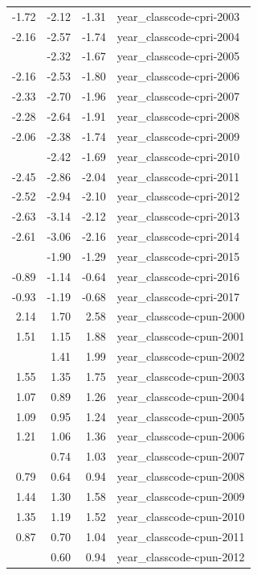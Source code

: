 \documentclass[]{article}
\begin{document}
\begin{longtable}[t]{rrrl}
-1.72 & -2.12 & -1.31 & year\_classcode-cpri-2003\\
-2.16 & -2.57 & -1.74 & year\_classcode-cpri-2004\\
\addlinespace
-2.00 & -2.32 & -1.67 & year\_classcode-cpri-2005\\
-2.16 & -2.53 & -1.80 & year\_classcode-cpri-2006\\
-2.33 & -2.70 & -1.96 & year\_classcode-cpri-2007\\
-2.28 & -2.64 & -1.91 & year\_classcode-cpri-2008\\
-2.06 & -2.38 & -1.74 & year\_classcode-cpri-2009\\
\addlinespace
-2.05 & -2.42 & -1.69 & year\_classcode-cpri-2010\\
-2.45 & -2.86 & -2.04 & year\_classcode-cpri-2011\\
-2.52 & -2.94 & -2.10 & year\_classcode-cpri-2012\\
-2.63 & -3.14 & -2.12 & year\_classcode-cpri-2013\\
-2.61 & -3.06 & -2.16 & year\_classcode-cpri-2014\\
\addlinespace
-1.60 & -1.90 & -1.29 & year\_classcode-cpri-2015\\
-0.89 & -1.14 & -0.64 & year\_classcode-cpri-2016\\
-0.93 & -1.19 & -0.68 & year\_classcode-cpri-2017\\
2.14 & 1.70 & 2.58 & year\_classcode-cpun-2000\\
1.51 & 1.15 & 1.88 & year\_classcode-cpun-2001\\
\addlinespace
1.70 & 1.41 & 1.99 & year\_classcode-cpun-2002\\
1.55 & 1.35 & 1.75 & year\_classcode-cpun-2003\\
1.07 & 0.89 & 1.26 & year\_classcode-cpun-2004\\
1.09 & 0.95 & 1.24 & year\_classcode-cpun-2005\\
1.21 & 1.06 & 1.36 & year\_classcode-cpun-2006\\
\addlinespace
0.89 & 0.74 & 1.03 & year\_classcode-cpun-2007\\
0.79 & 0.64 & 0.94 & year\_classcode-cpun-2008\\
1.44 & 1.30 & 1.58 & year\_classcode-cpun-2009\\
1.35 & 1.19 & 1.52 & year\_classcode-cpun-2010\\
0.87 & 0.70 & 1.04 & year\_classcode-cpun-2011\\
\addlinespace
0.77 & 0.60 & 0.94 & year\_classcode-cpun-2012\\

\end{longtable}
\end{document}
